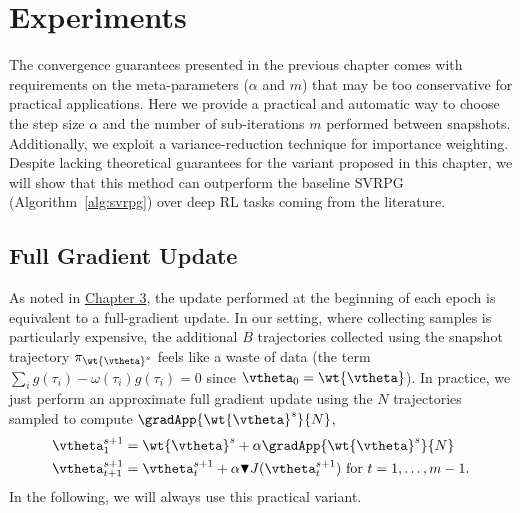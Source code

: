 \chapter{Experiments} \label{chap:experiments}
\vspace{-0.05in}
The convergence guarantees presented in the previous chapter comes with requirements on the meta-parameters (\ie $\alpha$ and $m$) that may be too conservative for practical applications.
Here we provide a practical and automatic way to choose the step size $\alpha$ and the number of sub-iterations $m$ performed between snapshots.
Additionally, we exploit a variance-reduction technique for importance weighting.
Despite lacking theoretical guarantees for the variant proposed in this chapter, we will show that this method can outperform the baseline \acs{SVRPG} (Algorithm~\ref{alg:svrpg}) over deep \acs{RL} tasks coming from the literature.

\vspace{-0.05in}
\section{Full Gradient Update}
\vspace{-0.05in}
As noted in \hyperref[chap:algorithm]{Chapter 3}, the update performed at the beginning of each epoch is equivalent to a full-gradient update. In our setting, where collecting samples is particularly expensive, the additional $B$ trajectories collected using the snapshot trajectory $\pi_{\wt{\vtheta}^s}$ feels like a waste of data (the term $\sum_i g(\tau_i) - \omega(\tau_i) g(\tau_i) =0$ since $\vtheta_0 = \wt{\vtheta}$).
In practice, we just perform an approximate full gradient update using the $N$ trajectories sampled to compute $\gradApp{\wt{\vtheta}^s}{N}$, \ie
\begin{align*}
&\vtheta_{1}^{s+1} = \wt{\vtheta}^s + \alpha\gradApp{\wt{\vtheta}^s}{N} \\
&\vtheta_{t+1}^{s+1} = \vtheta_t^{s+1} + \alpha 
\blacktriangledown J(\vtheta^{s+1}_t)
\text{ for $t=1,\dots,m-1$}.
\end{align*}
In the following, we will always use this practical variant.

\vspace{-0.05in}
